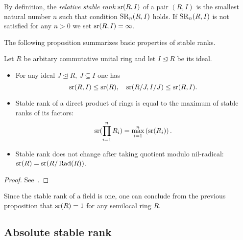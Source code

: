 By definition, the {\it relative stable rank} $\operatorname{sr}(R, I)$ of a pair $(R, I)$ is the smallest natural number $n$ such that condition $\operatorname{SR}_n(R, I)$ holds.
If $\operatorname{SR}_n(R, I)$ is not satisfied for any $n>0$ we set $\operatorname{sr}(R, I)=\infty$.

The following proposition summarizes basic properties of stable ranks.
\begin{prop} \label{prop:sr_properties} Let $R$ be arbitary commutative unital ring and let $I\trianglelefteq R$ be its ideal.
 \begin{itemize}
  \item For any ideal $J\trianglelefteq R$, $J\subseteq I$ one has $$\operatorname{sr}(R, I)\leq\operatorname{sr}(R),\quad \operatorname{sr}(R/J, I/J)\leq \operatorname{sr}(R, I).$$
  \item Stable rank of a direct product of rings is equal to the maximum of stable ranks of its factors: $$\operatorname{sr}(\prod\limits_{i=1}^n R_i) = \max\limits_{i=1}^n\left(\operatorname{sr}(R_i)\right).$$
  \item Stable rank does not change after taking quotient modulo nil-radical: $\operatorname{sr}(R)=\operatorname{sr}(R/\operatorname{Rad}(R))$.
 \end{itemize}\end{prop} \begin{proof} See~\cite{Va71}. \end{proof}

\begin{example} Since the stable rank of a field is one, one can conclude from the previous proposition that $\operatorname{sr}(R)=1$ for any semilocal ring $R$. \end{example}

\subsection{Absolute stable rank}

